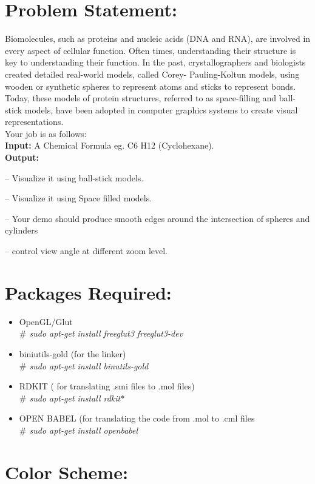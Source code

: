 \documentclass{report}
\let\oldmarginpar\marginpar
\renewcommand\marginpar[1]{\-\oldmarginpar[\raggedleft #1]%
{\raggedright #1}}
\newenvironment{checklist}{%
  \begin{list}{}{}%
  \let\olditem\item
  \renewcommand\item{\olditem -- \marginpar{$\Box$} }
  \newcommand\checkeditem{\olditem -- \marginpar{$\CheckedBox$} }
}{%
  \end{list}
}
\begin{document}
\section*{Problem Statement:}
Biomolecules, such as proteins and nucleic acids (DNA and RNA), are involved
in every aspect of cellular function. Often times, understanding their structure
is key to understanding their function. In the past, crystallographers and
biologists created detailed real-world models, called Corey- Pauling-Koltun
models, using wooden or synthetic spheres to represent atoms and sticks to
represent bonds. Today, these models of protein structures, referred to as
space-filling and ball-stick models, have been adopted in computer graphics
systems to create visual representations.\\
Your job is as follows:\\
\textbf{Input:}
A Chemical Formula eg. C6 H12 (Cyclohexane).\\
\textbf{Output:}
\begin{checklist}
  \checkeditem   Visualize it using ball-stick models.
  \checkeditem   Visualize it using Space filled models.
  \checkeditem   Your demo should produce smooth edges around the intersection of spheres and cylinders
  \checkeditem   control view angle at different zoom level.
\end{checklist}
\section*{Packages Required:}
\begin{itemize}
\item OpenGL/Glut \\
\textit{$\#$  sudo apt-get install freeglut3 freeglut3-dev}
\item biniutils-gold (for the linker)\\
\textit{$\#$  sudo apt-get install binutils-gold}
\item RDKIT ( for translating .smi files to .mol files)\\
\textit{$\#$  sudo apt-get install rdkit$*$}
\item OPEN BABEL (for translating the code from .mol to .cml files\\
\textit{$\#$ sudo apt-get install openbabel}
\
\end{itemize}
\section*{Color Scheme:}
\end{document}
